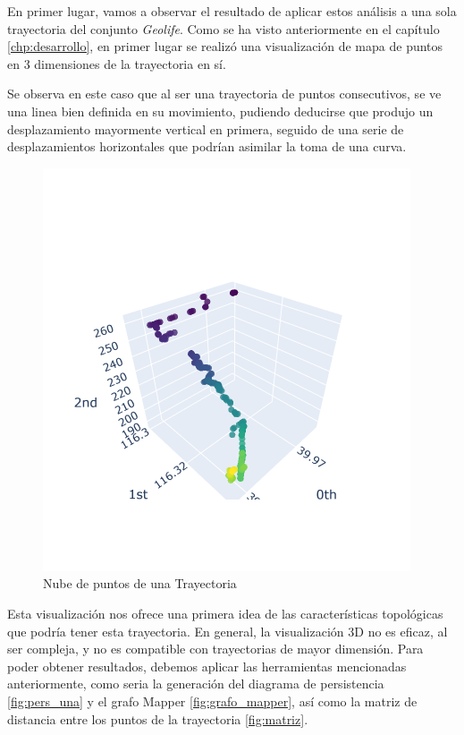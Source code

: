 \vspace{2cm}
En primer lugar, vamos a observar el resultado de aplicar estos análisis a una sola trayectoria del conjunto \textit{Geolife}. Como se ha visto anteriormente en el capítulo \ref{chp:desarrollo}, en primer lugar se realizó una visualización de mapa de puntos en 3 dimensiones de la trayectoria en sí. 

Se observa en este caso que al ser una trayectoria de puntos consecutivos, se ve una linea bien definida en su movimiento, pudiendo deducirse que produjo un desplazamiento mayormente vertical en primera, seguido de una serie de desplazamientos horizontales que podrían asimilar la toma de una curva.

\begin{figure}[H]
    \centering
    \includegraphics[scale=0.5]{images/puntos_trayec_sola.png}
    \caption{Nube de puntos de una Trayectoria}
    \label{fig:sola_trayec_nube}
\end{figure}

Esta visualización nos ofrece una primera idea de las características topológicas que podría tener esta trayectoria. En general, la visualización 3D no es eficaz, al ser compleja, y no es compatible con trayectorias de mayor dimensión. Para poder obtener resultados, debemos aplicar las herramientas mencionadas anteriormente, como seria la generación del diagrama de persistencia \ref{fig:pers_una} y el grafo Mapper \ref{fig:grafo_mapper}, así como la matriz de distancia entre los puntos de la trayectoria \ref{fig:matriz}. 

